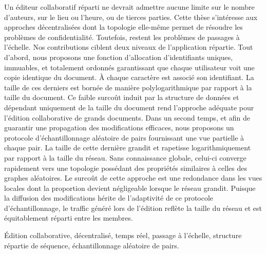 
\begin{resume}
  Un éditeur collaboratif réparti ne devrait admettre aucune limite sur le
  nombre d'auteurs, sur le lieu ou l'heure, ou de tierces parties. Cette thèse
  s'intéresse aux approches décentralisées dont la topologie elle-même permet de
  résoudre les problèmes de confidentialité. Toutefois, restent les problèmes de
  passages à l'échelle. Nos contributions ciblent deux niveaux de l'application
  répartie.  Tout d'abord, nous proposons une fonction d'allocation
  d'identifiants uniques, immuables, et totalement ordonnés garantissant que
  chaque utilisateur voit une copie identique du document. À chaque caractère
  est associé son identifiant. La taille de ces derniers est bornée de manière
  polylogarithmique par rapport à la taille du document. Ce faible surcoût
  induit par la structure de données et dépendant uniquement de la taille du
  document rend l'approche adéquate pour l'édition collaborative de grands
  documents. Dans un second temps, et afin de guarantir une propagation des
  modifications efficaces, nous proposons un protocole d'échantillonnage
  aléatoire de pairs fournissant une vue partielle à chaque pair. La taille de
  cette dernière grandit et rapetisse logarithmiquement par rapport à la taille
  du réseau. Sans connaissance globale, celui-ci converge rapidement vers une
  topologie possédant des propriétés similaires à celles des graphes
  aléatoires. Le surcoût de cette approche est une redondance dans les vues
  locales dont la proportion devient négligeable lorsque le réseau
  grandit. Puisque la diffusion des modifications hérite de l'adaptivité de ce
  protocole d'échantillonnage, le traffic généré lors de l'édition reflète la
  taille du réseau et est équitablement réparti entre les membres.
\end{resume}

\begin{motscles}
  Édition collaborative, décentralisé, temps réel, passage à l'échelle,
  structure répartie de séquence, échantillonnage aléatoire de pairs.
\end{motscles}

